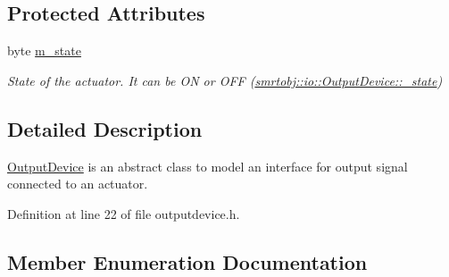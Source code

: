 \subsection*{Protected Attributes}
\begin{DoxyCompactItemize}
\item 
\hypertarget{classsmrtobj_1_1io_1_1_output_device_a269793861cb1a0fba566c70dfab3fafd}{}byte \hyperlink{classsmrtobj_1_1io_1_1_output_device_a269793861cb1a0fba566c70dfab3fafd}{m\+\_\+state}\label{classsmrtobj_1_1io_1_1_output_device_a269793861cb1a0fba566c70dfab3fafd}

\begin{DoxyCompactList}\small\item\em State of the actuator. It can be O\+N or O\+F\+F (\hyperlink{classsmrtobj_1_1io_1_1_output_device_a0c8010d79d7229137e4669f855c3e18b}{smrtobj\+::io\+::\+Output\+Device\+::\+\_\+state}) \end{DoxyCompactList}\end{DoxyCompactItemize}


\subsection{Detailed Description}
\hyperlink{classsmrtobj_1_1io_1_1_output_device}{Output\+Device} is an abstract class to model an interface for output signal connected to an actuator. 

Definition at line 22 of file outputdevice.\+h.



\subsection{Member Enumeration Documentation}
\hypertarget{classsmrtobj_1_1io_1_1_output_device_a0c8010d79d7229137e4669f855c3e18b}{}
